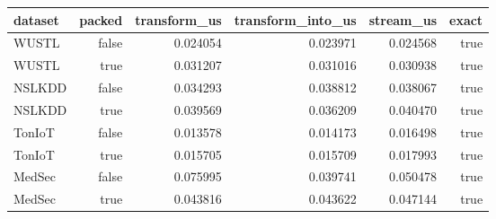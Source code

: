 \begin{tabular}{lrrrrr}
\toprule
dataset & packed & transform\_us & transform\_into\_us & stream\_us & exact \\
\midrule
WUSTL & false & 0.024054 & 0.023971 & 0.024568 & true \\
WUSTL & true & 0.031207 & 0.031016 & 0.030938 & true \\
NSLKDD & false & 0.034293 & 0.038812 & 0.038067 & true \\
NSLKDD & true & 0.039569 & 0.036209 & 0.040470 & true \\
TonIoT & false & 0.013578 & 0.014173 & 0.016498 & true \\
TonIoT & true & 0.015705 & 0.015709 & 0.017993 & true \\
MedSec & false & 0.075995 & 0.039741 & 0.050478 & true \\
MedSec & true & 0.043816 & 0.043622 & 0.047144 & true \\
\bottomrule
\end{tabular}

